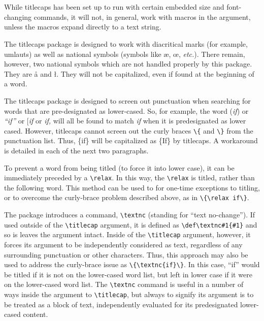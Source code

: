 \documentclass{article}
\def\tcp{\textsf{titlecaps}}
\def\QL{\titlecap{quirks, tricks, and limitations}}
\newcommand\margcmd[1]{\marginpar{\hfill\ttfamily\char'134#1}}
\begin{document}
{\section{\QL}

While {\tcp} has been set up to run with certain embedded size and
font-changing commands, it will not, in general, work with macros in the
argument, unless the macros expand directly to a text string.

The {\tcp} package is designed to work with diacritical marks (for
example, umlauts) as well as national symbols (symbols like \ae, \oe,
\textit{etc.}).  There remain, however, two national symbols which are
not handled properly by this package.  They are {\aa} and {\l}.  They
will not be capitalized, even if found at the beginning of a word.

The {\tcp} package is designed to screen out punctuation when searching
for words that are pre-designated as lower-cased.  So, for example, the
word (\textit{if}) or \textit{``if''} or [\textit{if} or \textit{if,}
will all be found to match \textit{if} when it is predesignated as lower
cased.  However, {\tcp} cannot screen out the curly braces \verb|\{| and
\verb|\}| from the punctuation list.  Thus, \{if\} will be capitalized
as \{If\} by \tcp.  A workaround is detailed in each of the next two
paragraphs.

To prevent a word from being titled (to force it into lower case), it
can be immediately preceded by a \verb|\relax|.  In this way, the
\verb|\relax| is titled, rather than the following word.  This method
can be used to for one-time exceptions to titling, or to overcome the
curly-brace problem described above, as in \verb|\{\relax if\}|.

The package introduces a command, \verb|\textnc|\margcmd{textnc}
(standing for ``text no-change'').  If used outside of the 
\verb|\titlecap| argument, it is defined as \verb|\def\textnc#1{#1}|
and so is leaves the argument intact.  Inside of the \verb|\titlecap|
argument, however, it forces its argument to be
independently considered as text, regardless of any surrounding
punctuation or other characters.  Thus, this approach may also be used
to address the curly-brace issue as \verb|\{\textnc{if}\}|.  In this
case, ``if'' would be titled if it is not on the lower-cased word list,
but left in lower case if it were on the lower-cased word list.  The
\verb|\textnc| command is useful in a number of ways inside the argument
to \verb|\titlecap|, but always to signify its argument is to be treated
as a block of text, independently evaluated for its predesignated
lower-cased content.

}
\end{document}
